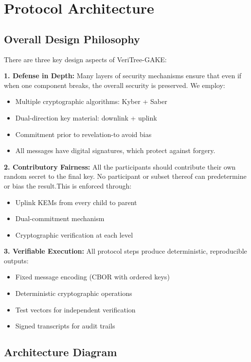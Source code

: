 \documentclass[12pt,a4paper]{report}
\begin{document}
\section{Protocol Architecture}

\subsection{Overall Design Philosophy}

There are three key design aspects of VeriTree-GAKE:

\textbf{1. Defense in Depth:}
Many layers of security mechanisms ensure that even if when one component breaks, the overall security is preserved. We employ:
\begin{itemize}
\item Multiple cryptographic algorithms: Kyber + Saber
\item Dual-direction key material: downlink + uplink
\item Commitment prior to revelation-to avoid bias
\item All messages have digital signatures, which protect against forgery.
\end{itemize}

\textbf{2. Contributory Fairness:}
All the participants should contribute their own random
secret to the final key. No participant or subset thereof can predetermine or bias the result.This is enforced through:
\begin{itemize}
\item Uplink KEMs from every child to parent 
\item Dual-commitment mechanism
\item Cryptographic verification at each level
\end{itemize}

\textbf{3. Verifiable Execution:}
All protocol steps produce deterministic, reproducible outputs:
\begin{itemize}
\item Fixed message encoding (CBOR with ordered keys)
\item Deterministic cryptographic operations
\item Test vectors for independent verification
\item Signed transcripts for audit trails
\end{itemize}

\subsection{Architecture Diagram}
\end{document}
